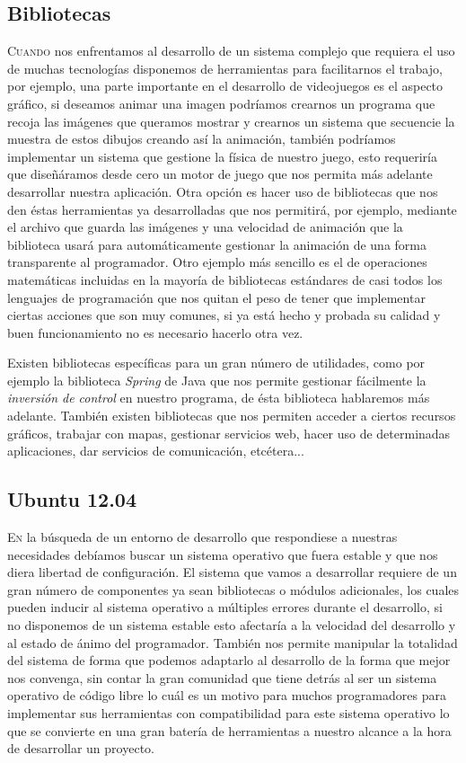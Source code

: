 \documentclass[12pt,a4paper,spanish]{book} %
\begin{document}
\subsection{Bibliotecas}

\lettrine{C}{uando} nos enfrentamos al desarrollo de un sistema complejo que requiera el uso de muchas tecnologías disponemos de herramientas para facilitarnos el trabajo, por ejemplo, una parte importante en el desarrollo de videojuegos es el aspecto gráfico, si deseamos animar una imagen podríamos crearnos un programa que recoja las imágenes que queramos mostrar y crearnos un sistema que secuencie la muestra de estos dibujos creando así la animación, también podríamos implementar un sistema que gestione la física de nuestro juego, esto requeriría que diseñáramos desde cero un motor de juego que nos permita más adelante desarrollar nuestra aplicación. Otra opción es hacer uso de bibliotecas que nos den éstas herramientas ya desarrolladas que nos permitirá, por ejemplo, mediante el archivo que guarda las imágenes y una velocidad de animación que la biblioteca usará para automáticamente gestionar la animación de una forma transparente al programador. Otro ejemplo más sencillo es el de operaciones matemáticas incluidas en la mayoría de bibliotecas estándares de casi todos los lenguajes de programación que nos quitan el peso de tener que implementar ciertas acciones que son muy comunes, si ya está hecho y probada su calidad y buen funcionamiento no es necesario hacerlo otra vez.

Existen bibliotecas específicas para un gran número de utilidades, como por ejemplo la biblioteca \emph{Spring} de Java que nos permite gestionar fácilmente la \emph{inversión de control} en nuestro programa, de ésta biblioteca hablaremos más adelante. También existen bibliotecas que nos permiten acceder a ciertos recursos gráficos, trabajar con mapas, gestionar servicios web, hacer uso de determinadas aplicaciones, dar servicios de comunicación, etcétera...

\newpage
\subsection{Ubuntu 12.04}

\lettrine{E}{n} la búsqueda de un entorno de desarrollo que respondiese a nuestras necesidades debíamos buscar un sistema operativo que fuera estable y que nos diera libertad de configuración. El sistema que vamos a desarrollar requiere de un gran número de componentes ya sean bibliotecas o módulos adicionales, los cuales pueden inducir al sistema operativo a múltiples errores durante el desarrollo, si no disponemos de un sistema estable esto afectaría a la velocidad del desarrollo y al estado de ánimo del programador. También nos permite manipular la totalidad del sistema de forma que podemos adaptarlo al desarrollo de la forma que mejor nos convenga, sin contar la gran comunidad que tiene detrás al ser un sistema operativo de código libre lo cuál es un motivo para muchos programadores para implementar sus herramientas con compatibilidad para este sistema operativo lo que se convierte en una gran batería de herramientas a nuestro alcance a la hora de desarrollar un proyecto.
\end{document}
